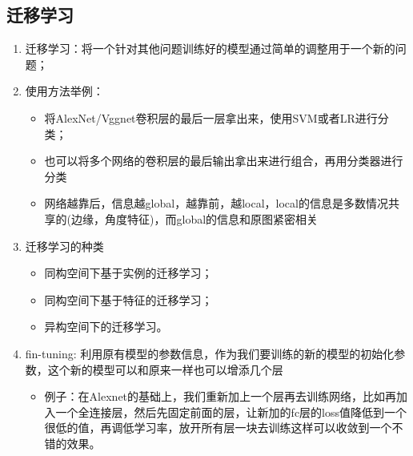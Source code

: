 \documentclass[UTF8]{article}%
\begin{document}
	\subsection{迁移学习}
		\begin{enumerate}
			\item 迁移学习：将一个针对其他问题训练好的模型通过简单的调整用于一个新的问题；
			\item 使用方法举例：
			\begin{itemize}
				\item 将AlexNet/Vggnet卷积层的最后一层拿出来，使用SVM或者LR进行分类；
				\item 也可以将多个网络的卷积层的最后输出拿出来进行组合，再用分类器进行分类
				\item 网络越靠后，信息越global，越靠前，越local，local的信息是多数情况共享的(边缘，角度特征)，而global的信息和原图紧密相关
			\end{itemize}
			\item 迁移学习的种类
			\begin{itemize}
				\item 同构空间下基于实例的迁移学习；
				\item 同构空间下基于特征的迁移学习；
				\item 异构空间下的迁移学习。
			\end{itemize}
			\item fin-tuning: 利用原有模型的参数信息，作为我们要训练的新的模型的初始化参数，这个新的模型可以和原来一样也可以增添几个层
			\begin{itemize}
				\item 例子：在Alexnet的基础上，我们重新加上一个层再去训练网络，比如再加入一个全连接层，然后先固定前面的层，让新加的fc层的loss值降低到一个很低的值，再调低学习率，放开所有层一块去训练这样可以收敛到一个不错的效果。
			\end{itemize}
		\end{enumerate}
	\newpage
\end{document}
